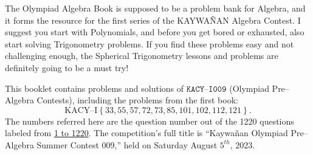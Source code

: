 \documentclass[12pt,a4paper]{memoir}
\theoremstyle{definition}
\begin{document}
		
		\vspace{0.5em}
		
		The Olympiad Algebra Book is supposed to be a problem bank for Algebra, and it forms the resource for the first series of the KAYWAÑAN Algebra Contest. I suggest you start with Polynomials, and before you get bored or exhausted, also start solving Trigonometry problems. If you find these problems easy and not challenging enough, the Spherical Trigonometry lessons and problems are definitely going to be a must try!
		
		
		\vspace{0.5em}
		
		This booklet contains problems and solutions of $\texttt{KACY--I009}$ (Olympiad Pre--Algebra Contests), including the problems from the first book: $$\text{KACY--I}\left\{33,55,57,72,73,85,101,102,112,121\right\}.$$ The numbers referred here are the question number out of the 1220 questions labeled from \href{https://github.com/parvardi/KACY/blob/main/KACY-VOL-I.pdf}{1 to 1220}. The competition's full title is ``Kaywañan Olympiad Pre--Algebra Summer Contest 009,'' held on Saturday August $5^{th}$, 2023.
%	
\end{document}

